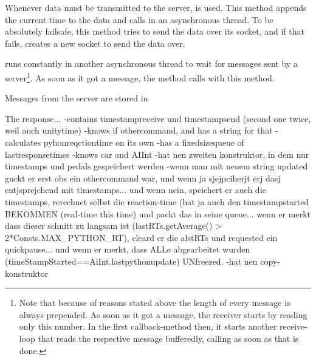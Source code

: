 Whenever data must be transmitted to the server,  is used. This method appends the current time to the data and calls  in an asynchronous thread. To be absolutely failsafe, this method tries to send the data over its socket, and if that fails, creates a new socket to send the data over. 

 runs constantly in another asynchronous thread to wait for messages sent by a server\footnote{Note that because of reasons stated above the length of every message is always prepended. As soon as it got a message, the receiver starts by reading only this number. In the first callback-method  then, it starts another receive-loop that reads the respective message bufferedly, calling  as soon as that is done.}. As soon as it got a message, the method  calls  with this method.

Messages from the server are stored in 


The response...
	-contains timestampreceive und timestampsend (second one twice, weil auch unitytime)
	-knows if othercommand, and has a string for that
	-calculates pyhonreqctiontime on its own
	-has a fixedsizequeue of lastresponsetimes
	-knows car and AIInt
	-hat nen zweiten konstruktor, in dem nur timestamps und pedals gespeichert werden
	-wenn man mit neuem string updated guckt er erst obs ein othercommand war, und wenn ja sjejpciherjt erj dasj entjsprejchend mit timestamps... und wenn nein, speichert er auch die timestamps, rerechnet selbst die reaction-time (hat ja auch den timestampstarted BEKOMMEN (real-time this time) und packt das in seine queue... wenn er merkt dass dieser schnitt zu langsam ist (lastRTs.getAverage() > 2*Consts.MAX_PYTHON_RT), cleard er die alstRTs und requested ein quickpause... und wenn er merkt, dass ALLe abgearbeitet wurden (timeStampStarted==AiInt.lastpythonupdate) UNfreezed.
	-hat nen copy-konstruktor

